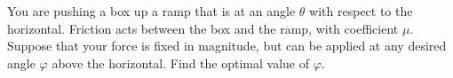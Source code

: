 You are pushing a box up a ramp that is at an angle $\theta$ with
respect to the horizontal. Friction acts between the box and the ramp,
with coefficient $\mu$. Suppose that your force is fixed in magnitude,
but can be applied at any desired angle $\varphi$ above the horizontal.
Find the optimal value of $\varphi$.\answercheck
